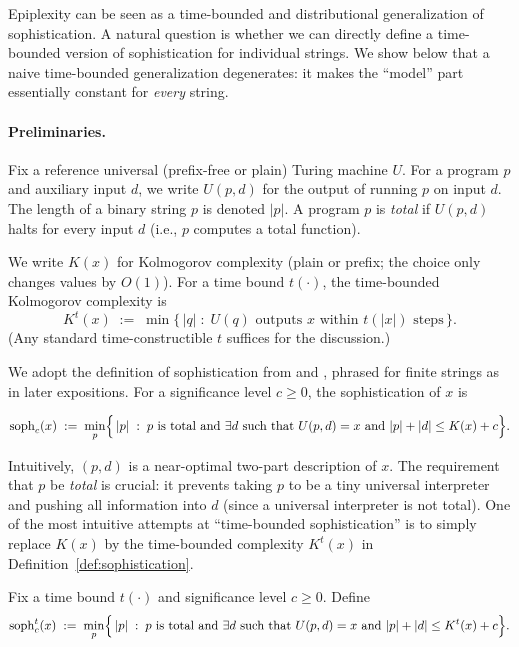 \documentclass[twoside]{article}
\begin{document}
Epiplexity can be seen as a time-bounded and distributional generalization of sophistication. A natural question is whether we can directly define a time-bounded version of sophistication for individual strings.
We show below that a naive time-bounded generalization degenerates: it makes the ``model'' part essentially constant for \emph{every} string.

\paragraph{Preliminaries.}
Fix a reference universal (prefix-free or plain) Turing machine $U$.
For a program $p$ and auxiliary input $d$, we write $U(p,d)$ for the output of running $p$ on input $d$.
The length of a binary string $p$ is denoted $|p|$.
A program $p$ is \emph{total} if $U(p,d)$ halts for every input $d$ (i.e., $p$ computes a total function).

We write $K(x)$ for Kolmogorov complexity (plain or prefix; the choice only changes values by $O(1)$).
For a time bound $t(\cdot)$, the time-bounded Kolmogorov complexity is
\[
K^{t}(x) \;:=\; \min\bigl\{\, |q| \;:\; U(q) \text{ outputs } x \text{ within } t(|x|) \text{ steps}\,\bigr\}.
\]
(Any standard time-constructible $t$ suffices for the discussion.)


We adopt the definition of sophistication from \citet{koppel1987structure} and \citet{antunes2006sophistication}, phrased for finite strings as in later expositions.
For a significance level $c \ge 0$, the sophistication of $x$ is
\begin{definition}
\label{def:sophistication}
\[
\mathrm{soph}_c(x)
\;:=\;
\min_{p}\Bigl\{\, |p| \;:\; p \text{ is total and } \exists d \text{ such that } U(p,d)=x \text{ and } |p|+|d| \le K(x)+c \Bigr\}.
\]
\end{definition}
Intuitively, $(p,d)$ is a near-optimal two-part description of $x$.
The requirement that $p$ be \emph{total} is crucial: it prevents taking $p$ to be a tiny universal interpreter and pushing all information into $d$ (since a universal interpreter is not total).
One of the most intuitive attempts at ``time-bounded sophistication'' is to simply replace $K(x)$ by the time-bounded complexity $K^{t}(x)$ in Definition~\ref{def:sophistication}.

\begin{definition}
\label{def:naive_time_soph}
Fix a time bound $t(\cdot)$ and significance level $c\ge 0$. Define
\[
\mathrm{soph}^{t}_c(x)
\;:=\;
\min_{p}\Bigl\{\, |p| \;:\; p \text{ is total and } \exists d \text{ such that } U(p,d)=x \text{ and } |p|+|d| \le K^{t}(x)+c \Bigr\}.
\]
\end{definition}
\end{document}
